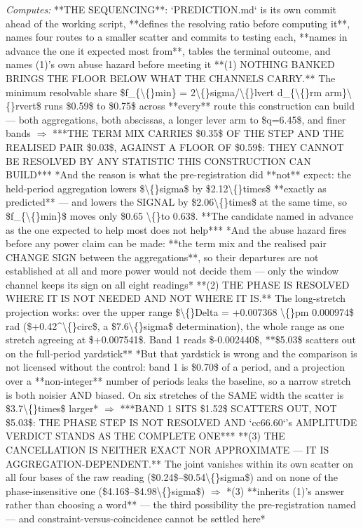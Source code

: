 \begin{description}
\emph{Computes:}  **THE SEQUENCING**: `PREDICTION.md` is its own commit ahead of the working script, **defines the resolving ratio before computing it**, names four routes to a smaller scatter and commits to testing each, **names in advance the one it expected most from**, tables the terminal outcome, and names (1)'s own abuse hazard before meeting it   **(1) NOTHING BANKED BRINGS THE FLOOR BELOW WHAT THE CHANNELS CARRY.** The minimum resolvable share \$f\_\{\textbackslash\{\}min\} = 2\textbackslash\{\}sigma/\textbackslash\{\}lvert d\_\{\textbackslash\{\}rm arm\}\textbackslash\{\}rvert\$ runs \$0.59\$ to \$0.75\$ across **every** route this construction can build --- both aggregations, both abscissas, a longer lever arm to \$q=6.45\$, and finer bands  \ensuremath{\Rightarrow} ***THE TERM MIX CARRIES \$0.35\$ OF THE STEP AND THE REALISED PAIR \$0.03\$, AGAINST A FLOOR OF \$0.59\$: THEY CANNOT BE RESOLVED BY ANY STATISTIC THIS CONSTRUCTION CAN BUILD***   *And the reason is what the pre-registration did **not** expect: the held-period aggregation lowers \$\textbackslash\{\}sigma\$ by \$2.12\textbackslash\{\}times\$ **exactly as predicted** --- and lowers the SIGNAL by \$2.06\textbackslash\{\}times\$ at the same time, so \$f\_\{\textbackslash\{\}min\}\$ moves only \$0.65 \textbackslash\{\}to 0.63\$.  **The candidate named in advance as the one expected to help most does not help***   *And the abuse hazard fires before any power claim can be made: **the term mix and the realised pair CHANGE SIGN between the aggregations**, so their departures are not established at all and more power would not decide them --- only the window channel keeps its sign on all eight readings*   **(2) THE PHASE IS RESOLVED WHERE IT IS NOT NEEDED AND NOT WHERE IT IS.** The long-stretch projection works: over the upper range \$\textbackslash\{\}Delta = +0.007368 \textbackslash\{\}pm 0.000974\$ rad (\$+0.42\textasciicircum{}\textbackslash\{\}circ\$, a \$7.6\textbackslash\{\}sigma\$ determination), the whole range as one stretch agreeing at \$+0.007541\$.  Band 1 reads \$-0.002440\$, **\$5.03\$ scatters out on the full-period yardstick**   *But that yardstick is wrong and the comparison is not licensed without the control: band 1 is \$0.70\$ of a period, and a projection over a **non-integer** number of periods leaks the baseline, so a narrow stretch is both noisier AND biased.  On six stretches of the SAME width the scatter is \$3.7\textbackslash\{\}times\$ larger*  \ensuremath{\Rightarrow} ***BAND 1 SITS \$1.52\$ SCATTERS OUT, NOT \$5.03\$: THE PHASE STEP IS NOT RESOLVED AND `cc66.60`'s AMPLITUDE VERDICT STANDS AS THE COMPLETE ONE***   **(3) THE CANCELLATION IS NEITHER EXACT NOR APPROXIMATE --- IT IS AGGREGATION-DEPENDENT.** The joint vanishes within its own scatter on all four bases of the raw reading (\$0.24\$--\$0.54\textbackslash\{\}sigma\$) and on none of the phase-insensitive one (\$4.16\$--\$4.98\textbackslash\{\}sigma\$) \ensuremath{\Rightarrow} *(3) **inherits (1)'s answer rather than choosing a word** --- the third possibility the pre-registration named --- and constraint-versus-coincidence cannot be settled here*

\end{description}
